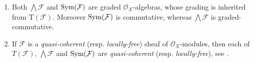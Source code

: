 \begin{rem}[]\leavevmode\vspace{-.2\baselineskip}
\label{rem:SheafSymExtProperties}
\begin{enumerate}
	\item Both $\bigwedge \mathcal{F}$ and $\operatorname{Sym}(\mathcal{F})$
		are graded $\mathcal{O}_{ X }$-algebras, whose grading is
		inherited from $\mathrm{T}(\mathcal{F})$.
		Moreover $\operatorname{Sym}(\mathcal{F})$ is commutative,
		whereas $\bigwedge \mathcal{F}$ is graded-commutative.


	\item \label{SheafqcSymExt}
		If $\mathcal{F}$ is a \emph{quasi-coherent} (resp$.$ \emph{locally-free})
		sheaf of $\mathcal{O}_{ X }$-modules,
		then each of $T(\mathcal{F})$, $\bigwedge \mathcal{F}$ and
		$\operatorname{Sym}(\mathcal{F})$ are \emph{quasi-coherent} (resp$.$ \emph{locally-free}),
		see \cite[\href{https://stacks.math.columbia.edu/tag/01CL}{Lemma 01CL}]{SP}.
\end{enumerate}
\end{rem}


